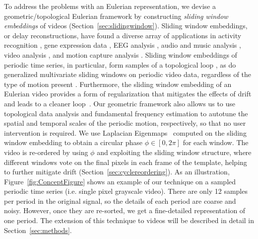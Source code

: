 \documentclass{article}
\begin{document}
To address the problems with an Eulerian representation, we devise a geometric/topological Eulerian framework by constructing {\em sliding window embeddings} of videos (Section~\ref{sec:slidingwindow}).  Sliding window embeddings, or delay reconstructions, have found a diverse array of applications in activity recognition \cite{frank2010activity,venkataraman2016shape}, gene expression data \cite{perea2015sw1pers}, EEG analysis \cite{stam2005nonlinear, plesnik2014detection}, audio and music analysis \cite{herzel1994analysis,serra2009cross,bello2011measuring,traliemoebius}, video analysis \cite{tralie2017quasi}, and motion capture analysis \cite{venkataraman2016shape}.  Sliding window embeddings of periodic time series, in particular, form samples of a topological loop \cite{perea2015sliding}, as do generalized multivariate sliding windows on periodic video data, regardless of the type of motion present \cite{traliehigh, tralie2017quasi}.  Furthermore, the sliding window embedding of an Eulerian video provides a form of regularization that mitigates the effects of drift and leads to a cleaner loop~\cite{tralie2017quasi}.  Our geometric framework also allows us to use topological data analysis \cite{edelsbrunner2000topological,edelsbrunner2008persistent,edelsbrunner2010computational,carlsson2009topology,ghrist2014elementary} and fundamental frequency estimation \cite{Mcleod05asmarter} to autotune the spatial and temporal scales of the periodic motion, respectively, so that no user intervention is required.  We use Laplacian Eigenmaps~\cite{belkin2003laplacian} computed on the sliding window embedding to obtain a circular phase $\phi \in [0, 2\pi]$ for each window.  The video is re-ordered by using $\phi$ and exploiting the sliding window structure, where different windows vote on the final pixels in each frame of the template, helping to further mitigate drift (Section~\ref{sec:cyclereordering}).  As an illustration, Figure~\ref{fig:ConceptFigure} shows an example of our technique on a sampled periodic time series (i.e. single pixel grayscale video).  There are only 12 samples per period in the original signal, so the details of each period are coarse and noisy.  However, once they are re-sorted, we get a fine-detailed representation of one period.  The extension of this technique to videos will be described in detail in Section~\ref{sec:methods}.
\end{document}
